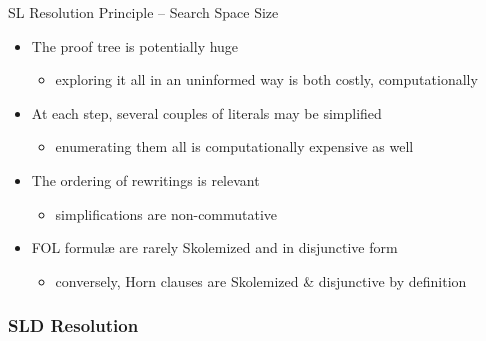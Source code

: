 \documentclass[presentation]{beamer}\mode<presentation>{\usetheme{AMSBolognaFC}}
\begin{document}
\begin{frame}{SL Resolution Principle -- Search Space Size}
    \begin{itemize}
        \item The proof tree is potentially \alert{huge}
        \begin{itemize}
            \item exploring it all in an \alert{uninformed} way is both costly, computationally
        \end{itemize}
        
        \vfill

        \item At each step, several couples of literals may be simplified
        \begin{itemize}
            \item enumerating them all is computationally expensive as well
        \end{itemize}
        
        \vfill

        \item The ordering of rewritings is \alert{relevant}
        \begin{itemize}
            \item simplifications are \alert{non-commutative}
        \end{itemize}

        \vfill

        \item FOL formul\ae{} are \alert{rarely} Skolemized and in \alert{disjunctive} form
        \begin{itemize}
            \item conversely, Horn clauses are Skolemized \& disjunctive \alert{by definition}
        \end{itemize}
    \end{itemize}
\end{frame}

\subsubsection{SLD Resolution}
\end{document}
